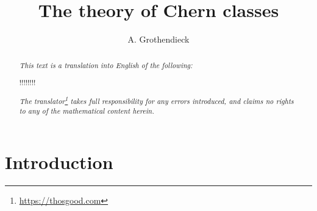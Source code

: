 \documentclass{article}
\title{The theory of Chern classes}
\author{A. Grothendieck}
\date{}
\newcommand{\oldpage}[1]{\marginpar{\footnotesize$\Big\vert$ \textit{p.~#1}}}
\begin{document}
\maketitle
\thispagestyle{fancy}

\renewcommand{\abstractname}{Translator's note}

\begin{abstract}
  \renewcommand*{\thefootnote}{\fnsymbol{footnote}}
  \emph{This text is a translation into English of the following:}

  !!!!!!!!

  \emph{The translator\footnote{\url{https://thosgood.com}} takes full responsibility for any errors introduced, and claims no rights to any of the mathematical content herein.}
\end{abstract}

\setcounter{footnote}{0}

\tableofcontents



\providecommand{\HH}{\operatorname{H}}
\providecommand{\rank}{\operatorname{rank}}
\providecommand{\cl}{\operatorname{cl}}
\providecommand{\PP}{\mathbf{P}}

\providecommand{\scr}[1]{{\mathscr{#1}}}
\renewcommand{\cal}[1]{{\mathcal{#1}}}

\renewcommand{\geq}{\geqslant}
\renewcommand{\leq}{\leqslant}

\hypertarget{introduction}{%
\section*{Introduction}\label{introduction}}

\oldpage{137}
\end{document}
